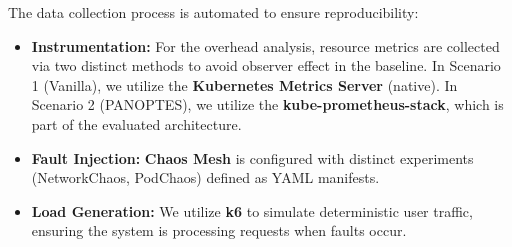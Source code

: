 The data collection process is automated to ensure reproducibility:
\begin{itemize}
    \item \textbf{Instrumentation:} For the overhead analysis, resource metrics are collected via two distinct methods to avoid observer effect in the baseline. In Scenario 1 (Vanilla), we utilize the \textbf{Kubernetes Metrics Server} (native). In Scenario 2 (PANOPTES), we utilize the \textbf{kube-prometheus-stack}, which is part of the evaluated architecture.
    \item \textbf{Fault Injection:} \textbf{Chaos Mesh} is configured with distinct experiments (NetworkChaos, PodChaos) defined as YAML manifests.
    \item \textbf{Load Generation:} We utilize \textbf{k6} to simulate deterministic user traffic, ensuring the system is processing requests when faults occur.
\end{itemize}
